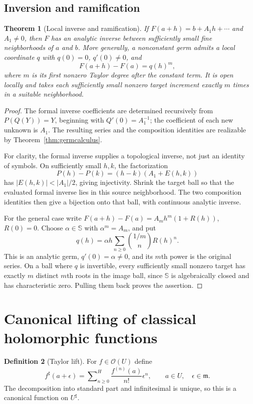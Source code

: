 \documentclass[11pt,a4paper]{article}
\newtheorem{theorem}{Theorem}[section]
\theoremstyle{definition}
\newtheorem{definition}[theorem]{Definition}
\theoremstyle{remark}
\newcommand{\SC}{\mathbb S}
\newcommand{\OO}{\mathcal O}
\newcommand{\mm}{\mathfrak m}
\newcommand{\Hs}{\mathop{\sum}\nolimits^{\!H}}
\begin{document}
\subsection{Inversion and ramification}
\begin{theorem}[Local inverse and ramification]\label{thm:inverse}
If $F(a+h)=b+A_1h+\cdots$ and $A_1\ne0$, then $F$ has an analytic
inverse between sufficiently small fine neighborhoods of $a$ and $b$.
More generally, a nonconstant germ admits a local coordinate $q$ with
$q(0)=0$, $q'(0)\ne0$, and
\begin{equation}\label{eq:ramification}
 F(a+h)-F(a)=q(h)^m,
\end{equation}
where $m$ is its first nonzero Taylor degree after the constant term.
It is open locally and takes each sufficiently small nonzero target
increment exactly $m$ times in a suitable neighborhood.
\end{theorem}
\begin{proof}
The formal inverse coefficients are determined recursively from
$P(Q(Y))=Y$, beginning with $Q'(0)=A_1^{-1}$; the coefficient of each
new unknown is $A_1$. The resulting series and the composition
identities are realizable by Theorem~\ref{thm:germcalculus}.

For clarity, the formal inverse supplies a topological inverse, not
just an identity of symbols. On sufficiently small $h,k$, the
factorization
\[
 P(h)-P(k)=(h-k)(A_1+E(h,k))
\]
has $|E(h,k)|<|A_1|/2$, giving injectivity. Shrink the target ball so
that the evaluated formal inverse lies in this source neighborhood.
The two composition identities then give a bijection onto that ball,
with continuous analytic inverse.

For the general case write
$F(a+h)-F(a)=A_mh^m(1+R(h))$, $R(0)=0$.
Choose $\alpha\in\SC$ with $\alpha^m=A_m$, and put
\[
 q(h)=\alpha h\sum_{n\ge0}{1/m\choose n}R(h)^n.
\]
This is an analytic germ, $q'(0)=\alpha\ne0$, and its $m$th power
is the original series. On a ball where $q$ is invertible, every
sufficiently small nonzero target has exactly $m$ distinct $m$th
roots in the image ball, since $\SC$ is algebraically closed and
has characteristic zero. Pulling them back proves the assertion.
\end{proof}

\section{Canonical lifting of classical holomorphic functions}\label{sec:lift}
\begin{definition}[Taylor lift]
For $f\in\OO(U)$ define
\begin{equation}\label{eq:lift}
 f^\sharp(a+\epsilon)=
 \Hs_{n\ge0}\frac{f^{(n)}(a)}{n!}\epsilon^n,
 \qquad a\in U,\quad\epsilon\in\mm.
\end{equation}
The decomposition into standard part and infinitesimal is unique, so
this is a canonical function on $U^\sharp$.
\end{definition}
\end{document}
